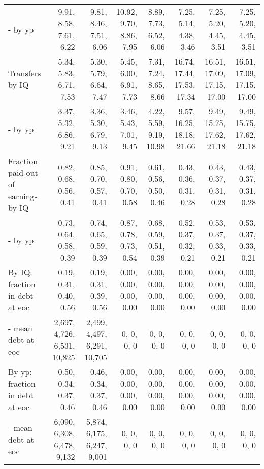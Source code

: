 \begin{tabular}{lrrrrrrr}
- by yp & 9.91, 8.58, 7.61, 6.22  & 9.81, 8.46, 7.51, 6.06  & 10.92, 9.70, 8.86, 7.95  & 8.89, 7.73, 6.52, 6.06  & 7.25, 5.14, 4.38, 3.46  & 7.25, 5.20, 4.45, 3.51  & 7.25, 5.20, 4.45, 3.51  \\ 
Transfers by IQ & 5.34, 5.83, 6.71, 7.53  & 5.30, 5.79, 6.64, 7.47  & 5.45, 6.00, 6.91, 7.73  & 7.31, 7.24, 8.65, 8.66  & 16.74, 17.44, 17.53, 17.34  & 16.51, 17.09, 17.15, 17.00  & 16.51, 17.09, 17.15, 17.00  \\ 
- by yp & 3.37, 5.32, 6.86, 9.21  & 3.36, 5.30, 6.79, 9.13  & 3.46, 5.43, 7.01, 9.45  & 4.22, 5.59, 9.19, 10.98  & 9.57, 16.25, 18.18, 21.66  & 9.49, 15.75, 17.62, 21.18  & 9.49, 15.75, 17.62, 21.18  \\ 
Fraction paid out of earnings by IQ & 0.82, 0.68, 0.56, 0.41  & 0.85, 0.70, 0.57, 0.41  & 0.91, 0.80, 0.70, 0.58  & 0.61, 0.56, 0.50, 0.46  & 0.43, 0.36, 0.31, 0.28  & 0.43, 0.37, 0.31, 0.28  & 0.43, 0.37, 0.31, 0.28  \\ 
- by yp & 0.73, 0.64, 0.58, 0.39  & 0.74, 0.65, 0.59, 0.39  & 0.87, 0.78, 0.73, 0.54  & 0.68, 0.59, 0.51, 0.39  & 0.52, 0.37, 0.32, 0.21  & 0.53, 0.37, 0.33, 0.21  & 0.53, 0.37, 0.33, 0.21  \\ 
By IQ: fraction in debt at eoc & 0.19, 0.31, 0.40, 0.56  & 0.19, 0.31, 0.39, 0.56  & 0.00, 0.00, 0.00, 0.00  & 0.00, 0.00, 0.00, 0.00  & 0.00, 0.00, 0.00, 0.00  & 0.00, 0.00, 0.00, 0.00  & 0.00, 0.00, 0.00, 0.00  \\ 
- mean debt at eoc & 2,697, 4,726, 6,531, 10,825  & 2,499, 4,497, 6,291, 10,705  & 0, 0, 0, 0  & 0, 0, 0, 0  & 0, 0, 0, 0  & 0, 0, 0, 0  & 0, 0, 0, 0  \\ 
By yp: fraction in debt at eoc & 0.50, 0.34, 0.37, 0.46  & 0.46, 0.34, 0.37, 0.46  & 0.00, 0.00, 0.00, 0.00  & 0.00, 0.00, 0.00, 0.00  & 0.00, 0.00, 0.00, 0.00  & 0.00, 0.00, 0.00, 0.00  & 0.00, 0.00, 0.00, 0.00  \\ 
- mean debt at eoc & 6,090, 6,308, 6,478, 9,132  & 5,874, 6,175, 6,247, 9,001  & 0, 0, 0, 0  & 0, 0, 0, 0  & 0, 0, 0, 0  & 0, 0, 0, 0  & 0, 0, 0, 0  \\ 
\hline
\end{tabular}%

